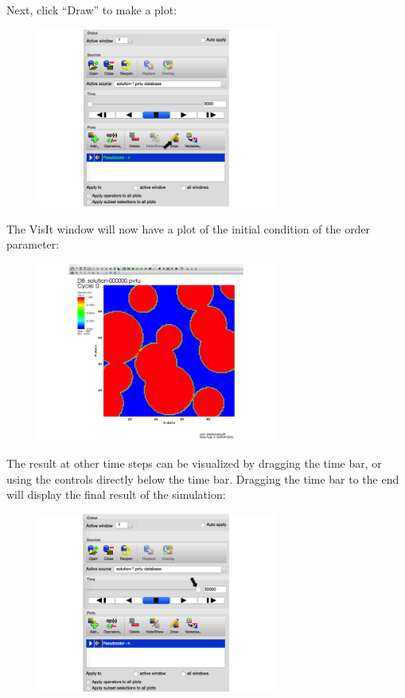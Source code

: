 \documentclass[10pt]{article} %
\begin{document}
Next, click ``Draw'' to make a plot:
\begin{figure}[H]
\vspace{0pt}
\centering
\includegraphics[width=0.7\textwidth]{visit_pseudocolor.png}
\vspace{0pt}
\end{figure}
The VisIt window will now have a plot of the initial condition of the order parameter:
\begin{figure}[H]
\vspace{0pt}
\centering
\includegraphics[width=0.7\textwidth]{visit_result.png}
\vspace{0pt}
\end{figure}
The result at other time steps can be visualized by dragging the time bar, or using the controls directly below the time bar. Dragging the time bar to the end will display the final result of the simulation:
\begin{figure}[H]
\vspace{0pt}
\centering
\includegraphics[width=0.7\textwidth]{visit_time_bar.png}
\vspace{0pt}
\end{figure}
\end{document}
